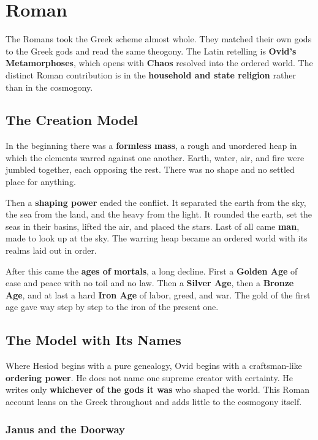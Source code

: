 \section{Roman}

The Romans took the Greek scheme almost whole. They matched their own gods to the
Greek gods and read the same theogony. The Latin retelling is \textbf{Ovid's
Metamorphoses}, which opens with \textbf{Chaos} resolved into the ordered world.
The distinct Roman contribution is in the \textbf{household and state religion}
rather than in the cosmogony.

\subsection{The Creation Model}

In the beginning there was a \textbf{formless mass}, a rough and unordered heap
in which the elements warred against one another. Earth, water, air, and fire were
jumbled together, each opposing the rest. There was no shape and no settled place
for anything.

Then a \textbf{shaping power} ended the conflict. It separated the earth from the
sky, the sea from the land, and the heavy from the light. It rounded the earth,
set the seas in their basins, lifted the air, and placed the stars. Last of all
came \textbf{man}, made to look up at the sky. The warring heap became an ordered
world with its realms laid out in order.

After this came the \textbf{ages of mortals}, a long decline. First a
\textbf{Golden Age} of ease and peace with no toil and no law. Then a
\textbf{Silver Age}, then a \textbf{Bronze Age}, and at last a hard \textbf{Iron
Age} of labor, greed, and war. The gold of the first age gave way step by step to
the iron of the present one.

\subsection{The Model with Its Names}

Where Hesiod begins with a pure genealogy, Ovid begins with a craftsman-like
\textbf{ordering power}. He does not name one supreme creator with certainty. He
writes only \textbf{whichever of the gods it was} who shaped the world. This Roman
account leans on the Greek throughout and adds little to the cosmogony itself.

\subsubsection{Janus and the Doorway}

